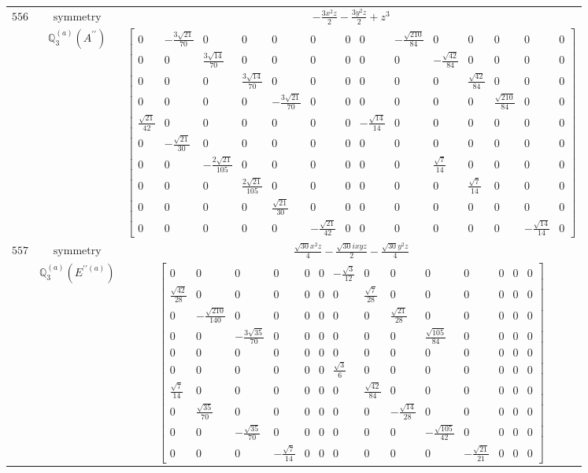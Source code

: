\documentclass[fleqn,8pt,landscape]{jsarticle}
\begin{document}
\begin{longtable}{ccc}
$ 556 $ & $ \text{symmetry} $ & $ - \frac{3 x^{2} z}{2} - \frac{3 y^{2} z}{2} + z^{3} $ \\
$  $ & $ \mathbb{Q}_{3}^{(a)}(A^{\prime\prime}) $ & $ \begin{bmatrix} 0 & - \frac{3 \sqrt{21}}{70} & 0 & 0 & 0 & 0 & 0 & 0 & - \frac{\sqrt{210}}{84} & 0 & 0 & 0 & 0 & 0 \\ 0 & 0 & \frac{3 \sqrt{14}}{70} & 0 & 0 & 0 & 0 & 0 & 0 & - \frac{\sqrt{42}}{84} & 0 & 0 & 0 & 0 \\ 0 & 0 & 0 & \frac{3 \sqrt{14}}{70} & 0 & 0 & 0 & 0 & 0 & 0 & \frac{\sqrt{42}}{84} & 0 & 0 & 0 \\ 0 & 0 & 0 & 0 & - \frac{3 \sqrt{21}}{70} & 0 & 0 & 0 & 0 & 0 & 0 & \frac{\sqrt{210}}{84} & 0 & 0 \\ \frac{\sqrt{21}}{42} & 0 & 0 & 0 & 0 & 0 & 0 & - \frac{\sqrt{14}}{14} & 0 & 0 & 0 & 0 & 0 & 0 \\ 0 & - \frac{\sqrt{21}}{30} & 0 & 0 & 0 & 0 & 0 & 0 & 0 & 0 & 0 & 0 & 0 & 0 \\ 0 & 0 & - \frac{2 \sqrt{21}}{105} & 0 & 0 & 0 & 0 & 0 & 0 & \frac{\sqrt{7}}{14} & 0 & 0 & 0 & 0 \\ 0 & 0 & 0 & \frac{2 \sqrt{21}}{105} & 0 & 0 & 0 & 0 & 0 & 0 & \frac{\sqrt{7}}{14} & 0 & 0 & 0 \\ 0 & 0 & 0 & 0 & \frac{\sqrt{21}}{30} & 0 & 0 & 0 & 0 & 0 & 0 & 0 & 0 & 0 \\ 0 & 0 & 0 & 0 & 0 & - \frac{\sqrt{21}}{42} & 0 & 0 & 0 & 0 & 0 & 0 & - \frac{\sqrt{14}}{14} & 0 \end{bmatrix} $ \\ \hline
$ 557 $ & $ \text{symmetry} $ & $ \frac{\sqrt{30} x^{2} z}{4} - \frac{\sqrt{30} i x y z}{2} - \frac{\sqrt{30} y^{2} z}{4} $ \\
$  $ & $ \mathbb{Q}_{3}^{(a)}(E^{\prime\prime(a)}) $ & $ \begin{bmatrix} 0 & 0 & 0 & 0 & 0 & 0 & - \frac{\sqrt{3}}{12} & 0 & 0 & 0 & 0 & 0 & 0 & 0 \\ \frac{\sqrt{42}}{28} & 0 & 0 & 0 & 0 & 0 & 0 & \frac{\sqrt{7}}{28} & 0 & 0 & 0 & 0 & 0 & 0 \\ 0 & - \frac{\sqrt{210}}{140} & 0 & 0 & 0 & 0 & 0 & 0 & \frac{\sqrt{21}}{28} & 0 & 0 & 0 & 0 & 0 \\ 0 & 0 & - \frac{3 \sqrt{35}}{70} & 0 & 0 & 0 & 0 & 0 & 0 & \frac{\sqrt{105}}{84} & 0 & 0 & 0 & 0 \\ 0 & 0 & 0 & 0 & 0 & 0 & 0 & 0 & 0 & 0 & 0 & 0 & 0 & 0 \\ 0 & 0 & 0 & 0 & 0 & 0 & \frac{\sqrt{3}}{6} & 0 & 0 & 0 & 0 & 0 & 0 & 0 \\ \frac{\sqrt{7}}{14} & 0 & 0 & 0 & 0 & 0 & 0 & \frac{\sqrt{42}}{84} & 0 & 0 & 0 & 0 & 0 & 0 \\ 0 & \frac{\sqrt{35}}{70} & 0 & 0 & 0 & 0 & 0 & 0 & - \frac{\sqrt{14}}{28} & 0 & 0 & 0 & 0 & 0 \\ 0 & 0 & - \frac{\sqrt{35}}{70} & 0 & 0 & 0 & 0 & 0 & 0 & - \frac{\sqrt{105}}{42} & 0 & 0 & 0 & 0 \\ 0 & 0 & 0 & - \frac{\sqrt{7}}{14} & 0 & 0 & 0 & 0 & 0 & 0 & - \frac{\sqrt{21}}{21} & 0 & 0 & 0 \end{bmatrix} $ \\ \hline

\end{longtable}
\end{document}
